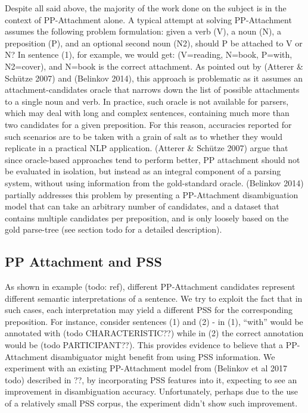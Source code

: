 Despite all said above, the majority of the work done on the subject is in the context of PP-Attachment alone. A typical attempt at solving PP-Attachment assumes the following problem formulation: given a verb (V), a noun (N), a preposition (P), and an optional second noun (N2), should P be attached to V or N? In sentence (1), for example, we would get: (V=reading, N=book, P=with, N2=cover), and N=book is the correct attachment.  As pointed out by (Atterer & Schütze 2007) and (Belinkov 2014), this approach is problematic as it assumes an attachment-candidates oracle that narrows down the list of possible attachments to a single noun and verb. In practice, such oracle is not available for parsers, which may deal with long and complex sentences, containing much more than two candidates for a given preposition. For this reason, accuracies reported for such scenarios are to be taken with a grain of salt as to whether they would replicate in a practical NLP application. (Atterer & Schütze 2007) argue that since oracle-based approaches tend to perform better, PP attachment should not be evaluated in isolation, but instead as an integral component of a parsing system, without using information from the gold-standard oracle. (Belinkov 2014) partially addresses this problem by presenting a PP-Attachment disambiguation model that can take an arbitrary number of candidates, and a dataset that contains multiple candidates per preposition, and is only loosely based on the gold parse-tree (see section todo for a detailed description).     

\subsection{PP Attachment and PSS}

As shown in example (todo: ref), different PP-Attachment candidates represent different semantic interpretations of a sentence. We try to exploit the fact that in such cases, each interpretation may yield a different PSS for the corresponding preposition. For instance, consider sentences (1) and (2) - in (1), “with” would be annotated with (todo CHARACTERISTIC??) while in (2) the correct annotation would be (todo PARTICIPANT??). This provides evidence to believe that a PP-Attachment disambiguator might benefit from using PSS information. We experiment with an existing PP-Attachment model from (Belinkov et al 2017 todo) described in ??, by incorporating PSS features into it, expecting to see an improvement in disambiguation accuracy. Unfortunately, perhaps due to the use of a relatively small PSS corpus, the experiment didn’t show such improvement.

